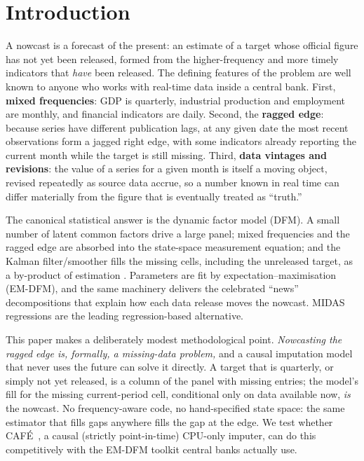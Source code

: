 \documentclass[11pt]{article}
\newcommand{\cafe}{CAF\'E}
\begin{document}
\section{Introduction}
A nowcast is a forecast of the present: an estimate of a target whose official figure
has not yet been released, formed from the higher-frequency and more timely indicators
that \emph{have} been released. The defining features of the problem are well known to
anyone who works with real-time data inside a central bank. First, \textbf{mixed
frequencies}: GDP is quarterly, industrial production and employment are monthly, and
financial indicators are daily. Second, the \textbf{ragged edge}: because series have
different publication lags, at any given date the most recent observations form a jagged
right edge, with some indicators already reporting the current month while the target is
still missing. Third, \textbf{data vintages and revisions}: the value of a series for a
given month is itself a moving object, revised repeatedly as source data accrue, so a
number known in real time can differ materially from the figure that is eventually
treated as ``truth.''

The canonical statistical answer is the dynamic factor model (DFM). A small number of
latent common factors drive a large panel; mixed frequencies and the ragged edge are
absorbed into the state-space measurement equation; and the Kalman filter/smoother fills
the missing cells, including the unreleased target, as a by-product of estimation
\cite{giannone2008nowcasting,marianoMurasawa2003,banbura2013nowcasting}. Parameters are
fit by expectation--maximisation (EM-DFM), and the same machinery delivers the celebrated
``news'' decompositions that explain how each data release moves the nowcast. MIDAS
regressions \cite{ghysels2004midas} are the leading regression-based alternative.

This paper makes a deliberately modest methodological point. \emph{Nowcasting the ragged
edge is, formally, a missing-data problem,} and a causal imputation model that never uses
the future can solve it directly. A target that is quarterly, or simply not yet released,
is a column of the panel with missing entries; the model's fill for the missing
current-period cell, conditional only on data available now, \emph{is} the nowcast. No
frequency-aware code, no hand-specified state space: the same estimator that fills gaps
anywhere fills the gap at the edge. We test whether \cafe{}~\cite{cafe2025}, a causal
(strictly point-in-time) CPU-only imputer, can do this competitively with the EM-DFM
toolkit central banks actually use.
\end{document}
